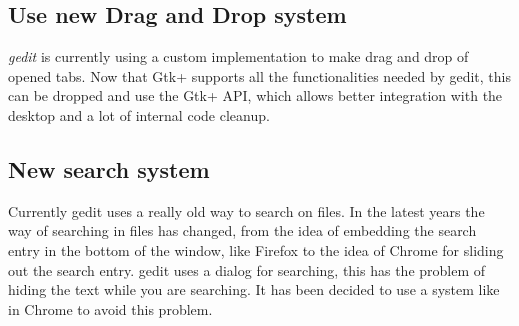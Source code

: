 \subsection{Use new Drag and Drop system}\label{sec:DND}

\emph{gedit} is currently using a custom implementation to make drag and drop of opened tabs. Now that Gtk+ supports all the functionalities needed by gedit, this can be dropped and use the Gtk+ API, which allows better integration with the desktop and a lot of internal code cleanup.

\subsection{New search system}\label{sec:SearchSystem}

Currently gedit uses a really old way to search on files. In the latest years the way of searching in files has changed, from the idea of embedding the search entry in the bottom of the window, like Firefox to the idea of Chrome for sliding out the search entry. gedit uses a dialog for searching, this has the problem of hiding the text while you are searching. It has been decided to use a system like in Chrome to avoid this problem.
